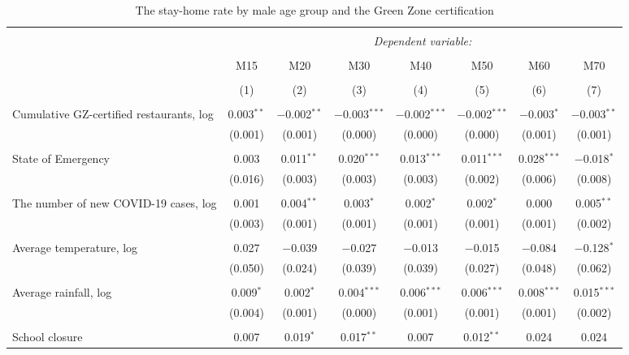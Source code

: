 
\begin{table}[!htbp] \centering 
  \caption{The stay-home rate by male age group and the Green Zone certification} 
  \label{} 
\footnotesize 
\begin{tabular}{@{\extracolsep{-11pt}}lccccccc} 
\\[-1.8ex]\hline 
\hline \\[-1.8ex] 
 & \multicolumn{7}{c}{\textit{Dependent variable:}} \\ 
\cline{2-8} 
\\[-1.8ex] & M15 & M20 & M30 & M40 & M50 & M60 & M70 \\ 
\\[-1.8ex] & (1) & (2) & (3) & (4) & (5) & (6) & (7)\\ 
\hline \\[-1.8ex] 
 Cumulative GZ-certified restaurants, log & 0.003$^{**}$ & $-$0.002$^{**}$ & $-$0.003$^{***}$ & $-$0.002$^{***}$ & $-$0.002$^{***}$ & $-$0.003$^{*}$ & $-$0.003$^{**}$ \\ 
  & (0.001) & (0.001) & (0.000) & (0.000) & (0.000) & (0.001) & (0.001) \\ 
  & & & & & & & \\ 
 State of Emergency & 0.003 & 0.011$^{**}$ & 0.020$^{***}$ & 0.013$^{***}$ & 0.011$^{***}$ & 0.028$^{***}$ & $-$0.018$^{*}$ \\ 
  & (0.016) & (0.003) & (0.003) & (0.003) & (0.002) & (0.006) & (0.008) \\ 
  & & & & & & & \\ 
 The number of new COVID-19 cases, log & 0.001 & 0.004$^{**}$ & 0.003$^{*}$ & 0.002$^{*}$ & 0.002$^{*}$ & 0.000 & 0.005$^{**}$ \\ 
  & (0.003) & (0.001) & (0.001) & (0.001) & (0.001) & (0.001) & (0.002) \\ 
  & & & & & & & \\ 
 Average temperature, log & 0.027 & $-$0.039 & $-$0.027 & $-$0.013 & $-$0.015 & $-$0.084 & $-$0.128$^{*}$ \\ 
  & (0.050) & (0.024) & (0.039) & (0.039) & (0.027) & (0.048) & (0.062) \\ 
  & & & & & & & \\ 
 Average rainfall, log & 0.009$^{*}$ & 0.002$^{*}$ & 0.004$^{***}$ & 0.006$^{***}$ & 0.006$^{***}$ & 0.008$^{***}$ & 0.015$^{***}$ \\ 
  & (0.004) & (0.001) & (0.000) & (0.001) & (0.001) & (0.001) & (0.002) \\ 
  & & & & & & & \\ 
 School closure & 0.007 & 0.019$^{*}$ & 0.017$^{**}$ & 0.007 & 0.012$^{**}$ & 0.024 & 0.024 \\ 

\end{tabular}
\end{table}
